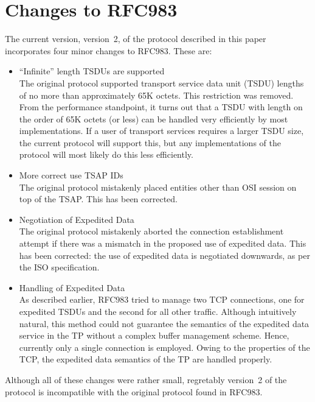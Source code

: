 
\section	{Changes to RFC983}\label{changes}
The current version, version~2, of the protocol described in this paper
incorporates four minor changes to RFC983\cite{TSAP.on.TCP.old}.
These are:
\begin{itemize}
\item	``Infinite'' length TSDUs are supported\\
The original protocol supported transport service data unit (TSDU) lengths
of no more than approximately 65K octets.
This restriction was removed.
From the performance standpoint,
it turns out that a TSDU with length on the order of 65K octets (or less) can
be handled very efficiently by most implementations.
If a user of transport services requires a larger TSDU size,
the current protocol will support this,
but any implementations of the protocol will most likely do this less
efficiently.

\item	More correct use TSAP IDs\\
The original protocol mistakenly placed entities other than OSI session
on top of the TSAP.
This has been corrected.

\item	Negotiation of Expedited Data\\
The original protocol mistakenly aborted the connection establishment attempt
if there was a mismatch in the proposed use of expedited data.
This has been corrected:
the use of expedited data is negotiated downwards, as per the ISO specification.

\item	Handling of Expedited Data\\
As described earlier,
RFC983 tried to manage two TCP connections,
one for expedited TSDUs and the second for all other traffic.
Although intuitively natural,
this method could not guarantee the semantics of the expedited data service
in the TP without a complex buffer management scheme.
Hence, currently only a single connection is employed.
Owing to the properties of the TCP,
the expedited data semantics of the TP are handled properly.
\end{itemize}

Although all of these changes were rather small,
regretably version~2 of the protocol is incompatible with the original
protocol found in RFC983.
